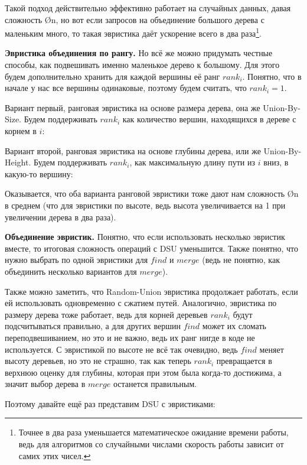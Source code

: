 
Такой подход действительно эффективно работает на случайных данных, давая сложность \O{\log n}, но вот если запросов на объединение большого дерева с маленьким много, то такая эвристика даёт ускорение всего в два раза\footnote{Точнее в два раза уменьшается математическое ожидание времени работы, ведь для алгоритмов со случайными числами скорость работы зависит от самих этих чисел.}.

\textbf{Эвристика объединения по рангу.} Но всё же можно придумать честные способы, как подвешивать именно маленькое дерево к большому. Для этого будем дополнительно хранить для каждой вершины её ранг $rank_i$. Понятно, что в начале у нас все вершины одинаковые, поэтому будем считать, что $rank_i = 1$.

Вариант первый, ранговая эвристика на основе размера дерева, она же Union-By-Size. Будем поддерживать $rank_i$ как количество вершин, находящихся в дереве с корнем в $i$:


Вариант второй, ранговая эвристика на основе глубины дерева, или же Union-By-Height. Будем поддерживать $rank_i$, как максимальную длину пути из $i$ вниз, в какую-то вершину:


Оказывается, что оба варианта ранговой эвристики тоже дают нам сложность \O{\log n} в среднем (что для эвристики по высоте, ведь высота увеличивается на 1 при увеличении дерева в два раза).

\textbf{Объединение эвристик.} Понятно, что если использовать несколько эвристик вместе, то итоговая сложность операций с DSU уменьшится. Также понятно, что нужно выбрать по одной эвристики для $find$ и $merge$ (ведь не понятно, как объединить несколько вариантов для $merge$).

Также можно заметить, что Random-Union эвристика продолжает работать, если ей использовать одновременно с сжатием путей. Аналогично, эвристика по размеру дерева тоже работает, ведь для корней деревьев $rank_i$ будут подсчитываться правильно, а для других вершин $find$ может их сломать переподвешиванием, но это и не важно, ведь их ранг нигде в коде не используется. С эвристикой по высоте не всё так очевидно, ведь $find$ меняет высоту деревьев, но это не страшно, так как теперь $rank_i$ превращается в верхнюю оценку для глубины, которая при этом была когда-то достижима, а значит выбор дерева в $merge$ останется правильным.

Поэтому давайте ещё раз представим DSU с эвристиками:

